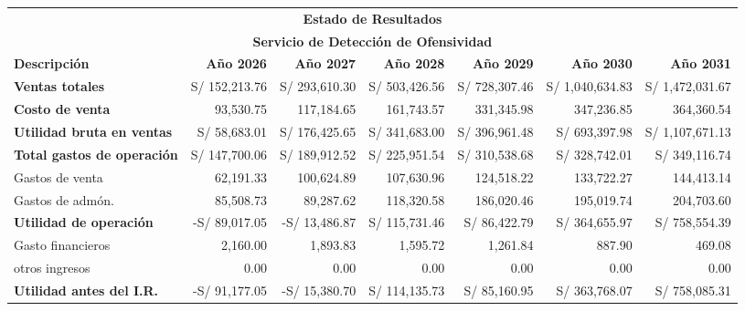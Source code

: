\begin{table}[H]
\centering
\scriptsize
\renewcommand{\arraystretch}{1.15}
\setlength{\tabcolsep}{3pt}
\begin{tabular}{|p{3.5cm}|r|r|r|r|r|r|}
\hline
\multicolumn{7}{|c|}{\textbf{Estado de Resultados}} \\ 
\multicolumn{7}{|c|}{\textbf{Servicio de Detección de Ofensividad}} \\ \hline
\textbf{Descripción} & \textbf{Año 2026} & \textbf{Año 2027} & \textbf{Año 2028} & \textbf{Año 2029} & \textbf{Año 2030} & \textbf{Año 2031} \\ \hline

\textbf{Ventas totales} 
& S/ 152,213.76 & S/ 293,610.30 & S/ 503,426.56 & S/ 728,307.46 & S/ 1,040,634.83 & S/ 1,472,031.67 \\ \hline

\textbf{Costo de venta} 
& 93,530.75 & 117,184.65 & 161,743.57 & 331,345.98 & 347,236.85 & 364,360.54 \\ \hline

\textbf{Utilidad bruta en ventas} 
& S/ 58,683.01 & S/ 176,425.65 & S/ 341,683.00 & S/ 396,961.48 & S/ 693,397.98 & S/ 1,107,671.13 \\ \hline

\textbf{Total gastos de operación} 
& S/ 147,700.06 & S/ 189,912.52 & S/ 225,951.54 & S/ 310,538.68 & S/ 328,742.01 & S/ 349,116.74 \\ \hline

Gastos de venta 
& 62,191.33 & 100,624.89 & 107,630.96 & 124,518.22 & 133,722.27 & 144,413.14 \\ \hline

Gastos de admón. 
& 85,508.73 & 89,287.62 & 118,320.58 & 186,020.46 & 195,019.74 & 204,703.60 \\ \hline

\textbf{Utilidad de operación} 
& -S/ 89,017.05 & -S/ 13,486.87 & S/ 115,731.46 & S/ 86,422.79 & S/ 364,655.97 & S/ 758,554.39 \\ \hline

Gasto financieros 
& 2,160.00 & 1,893.83 & 1,595.72 & 1,261.84 & 887.90 & 469.08 \\ \hline

otros ingresos 
& 0.00 & 0.00 & 0.00 & 0.00 & 0.00 & 0.00 \\ \hline

\textbf{Utilidad antes del I.R.} 
& -S/ 91,177.05 & -S/ 15,380.70 & S/ 114,135.73 & S/ 85,160.95 & S/ 363,768.07 & S/ 758,085.31 \\ \hline


\end{tabular}
\end{table}
